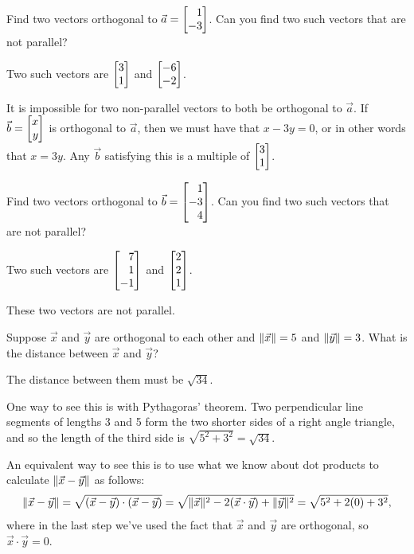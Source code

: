 	\begin{parts}
		\item Find two vectors orthogonal to $\vec a=\mat{1\\-3}$.  Can you find
			two such vectors that are not parallel?
			\begin{solution}
				Two such vectors are $\mat{3\\1}$ and $\mat{-6\\-2}$.

				It is impossible for two non-parallel vectors to both be
				orthogonal to $\vec a$. If $\vec b = \mat{x\\y}$ is orthogonal to
				$\vec a$, then we must have that $x - 3y = 0$, or in other words
				that $x = 3y$. Any $\vec b$ satisfying this is a multiple of
				$\mat{3\\1}$.
			\end{solution}
		\item Find two vectors orthogonal to $\vec b=\mat{1\\-3\\4}$.  Can you
			find two such vectors that are not parallel?
			\begin{solution}
				Two such vectors are $\mat{7\\1\\-1}$ and $\mat{2\\2\\1}$.

				These two vectors are not parallel.
			\end{solution}
		\item Suppose $\vec x$ and $\vec y$ are orthogonal to each other and
			$\lVert\vec x\rVert=5$ and $\lVert\vec y\rVert=3$. What is the distance between
			$\vec x$ and $\vec y$?
			\begin{solution}
				The distance between them must be $\sqrt{34}$.

				One way to see this is with Pythagoras' theorem. Two perpendicular
				line segments of lengths 3 and 5 form the two shorter sides of a
				right angle triangle, and so the length of the third side is
				$\sqrt{5^2 + 3^2} = \sqrt{34}$.

				An equivalent way to see this is to use what we know about dot
				products to calculate $\lVert\vec x-\vec y\rVert$ as follows:
				\[
					\lVert\vec x-\vec y\rVert = \sqrt{(\vec x-\vec y)\cdot(\vec x-\vec y)}
					= \sqrt{\lVert\vec x\rVert^2 - 2(\vec x\cdot\vec y) + \lVert\vec y\rVert^2}
					= \sqrt{5^2 + 2(0) + 3^2},
				\]
				where in the last step we've used the fact that $\vec x$ and $\vec y$
				are orthogonal, so $\vec x\cdot\vec y = 0$.
			\end{solution}
	\end{parts}

